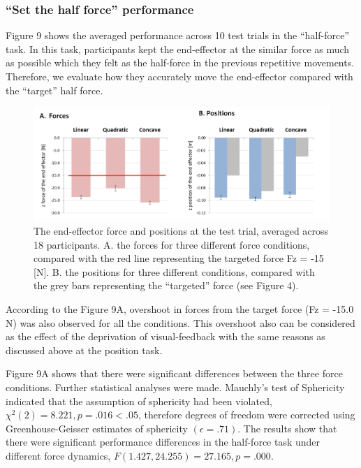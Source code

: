 \subsubsection{“Set the half force” performance}
Figure 9 shows the averaged performance across 10 test trials in the “half-force” task. In this task, participants kept the end-effector at the similar force as much as possible which they felt as the half-force in the previous repetitive movements. Therefore, we evaluate how they accurately move the end-effector compared with the “target” half force. 
%
\begin{figure}
	\centering
	\includegraphics[width=.7\textwidth]{Chie/figs/Figure9.png}
	\caption{The end-effector force and positions at the test trial, averaged across 18 participants. 
		A. the forces for three different force conditions, compared with the red line representing the targeted force Fz = -15 [N].  B. the positions for three different conditions, compared with the grey bars representing the “targeted” force (see Figure 4).}
	\label{half-force}
\end{figure}
According to the Figure 9A, overshoot in forces  from the target force (Fz = -15.0 N) was also observed for  all the conditions. This overshoot also can be considered as the effect of the deprivation of visual-feedback with the same reasons as discussed above at the position task.

Figure 9A shows that there were significant differences between the three force conditions. Further statistical analyses were made. Mauchly’s test of Sphericity indicated that the assumption of sphericity had been violated, $\chi^2 (2) = 8.221, p = .016 < .05$, therefore degrees of freedom were corrected using Greenhouse-Geisser estimates of sphericity $(\epsilon = .71)$. The results show that there were significant performance differences in the half-force task under different force dynamics, $F(1.427, 24.255) = 27.165, p = .000$.

